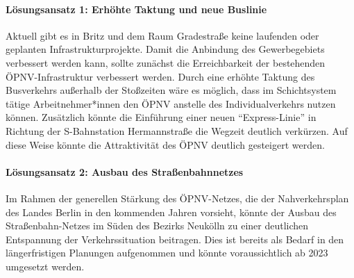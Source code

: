 \paragraph{Lösungsansatz 1: Erhöhte Taktung und neue Buslinie}
Aktuell gibt es in Britz und dem Raum Gradestraße keine laufenden oder geplanten Infrastrukturprojekte. Damit die Anbindung des Gewerbegebiets verbessert werden kann, sollte zunächst die Erreichbarkeit der bestehenden ÖPNV-Infrastruktur verbessert werden. Durch eine erhöhte Taktung des Busverkehrs außerhalb der Stoßzeiten wäre es möglich, dass im Schichtsystem tätige Arbeitnehmer*innen den ÖPNV anstelle des Individualverkehrs nutzen können. Zusätzlich könnte die Einführung einer neuen “Express-Linie” in Richtung der S-Bahnstation Hermannstraße die Wegzeit deutlich verkürzen. Auf diese Weise könnte die Attraktivität des ÖPNV deutlich gesteigert werden.

\paragraph{Lösungsansatz 2: Ausbau des Straßenbahnnetzes}
Im Rahmen der generellen Stärkung des ÖPNV-Netzes, die der Nahverkehrsplan des Landes Berlin in den kommenden Jahren vorsieht, könnte der Ausbau des Straßenbahn-Netzes im Süden des Bezirks Neukölln zu einer deutlichen Entspannung der Verkehrssituation beitragen. Dies ist bereits als Bedarf in den längerfristigen Planungen aufgenommen und könnte voraussichtlich ab 2023 umgesetzt werden.

